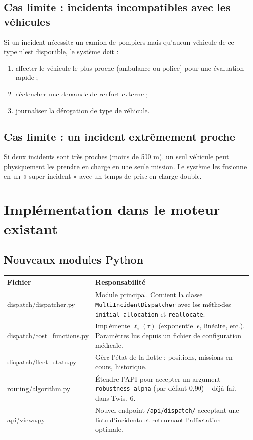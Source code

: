 \documentclass[12pt,a4paper]{article}
\theoremstyle{definition}
\theoremstyle{remark}
\begin{document}
\subsection{Cas limite : incidents incompatibles avec les véhicules}

Si un incident nécessite un camion de pompiers mais qu’aucun véhicule
de ce type n’est disponible, le système doit :
\begin{enumerate}
  \item affecter le véhicule le plus proche (ambulance ou police)
        pour une évaluation rapide ;
  \item déclencher une demande de renfort externe ;
  \item journaliser la dérogation de type de véhicule.
\end{enumerate}

\subsection{Cas limite : un incident extrêmement proche}

Si deux incidents sont très proches (moins de 500 m), un seul véhicule
peut physiquement les prendre en charge en une seule mission. Le
système les fusionne en un « super‑incident » avec un temps de prise
en charge double.

\newpage

\section{Implémentation dans le moteur existant}

\subsection{Nouveaux modules Python}

\begin{center}
\begin{tabular}{>{\ttfamily}p{4cm} p{9cm}}
  \toprule
  \textbf{Fichier} & \textbf{Responsabilité} \\
  \midrule
  dispatch/dispatcher.py &
    Module principal. Contient la classe \texttt{MultiIncidentDispatcher}
    avec les méthodes \texttt{initial\_allocation} et \texttt{reallocate}. \\[0.4em]
  dispatch/cost\_functions.py &
    Implémente $\ell_i(\tau)$ (exponentielle, linéaire, etc.). Paramètres
    lus depuis un fichier de configuration médicale. \\[0.4em]
  dispatch/fleet\_state.py &
    Gère l’état de la flotte : positions, missions en cours, historique. \\[0.4em]
  routing/algorithm.py &
    Étendre l’API pour accepter un argument \texttt{robustness\_alpha}
    (par défaut 0,90) – déjà fait dans Twist 6. \\[0.4em]
  api/views.py &
    Nouvel endpoint \texttt{/api/dispatch/} acceptant une liste d’incidents
    et retournant l’affectation optimale. \\[0.4em]
  \bottomrule
\end{tabular}
\end{center}
\end{document}
